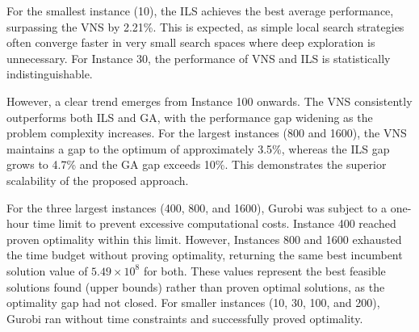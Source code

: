\documentclass[preprint,12pt,authoryear]{elsarticle}
\begin{document}
For the smallest instance (10), the ILS achieves the best average performance, surpassing the VNS by 2.21\%. This is expected, as simple local search strategies often converge 
faster in very small search spaces where deep exploration is unnecessary. For Instance 30, the performance of VNS and ILS is statistically indistinguishable.

However, a clear trend emerges from Instance 100 onwards. The VNS consistently outperforms both ILS and GA, with the performance gap widening as the problem complexity increases. 
For the largest instances (800 and 1600), the VNS maintains a gap to the optimum of approximately 3.5\%, whereas the ILS gap grows to 4.7\% and the GA gap exceeds 10\%. 
This demonstrates the superior scalability of the proposed approach.

For the three largest instances (400, 800, and 1600), Gurobi was subject to a one-hour time limit to prevent excessive computational costs. Instance 400 reached proven optimality 
within this limit. However, Instances 800 and 1600 exhausted the time budget without proving optimality, returning the same best incumbent solution value of $5.49 \times 10^8$ for both. 
These values represent the best feasible solutions found (upper bounds) rather than proven optimal solutions, as the optimality gap had not closed. For smaller instances (10, 30, 100, and 200), 
Gurobi ran without time constraints and successfully proved optimality.
\end{document}
